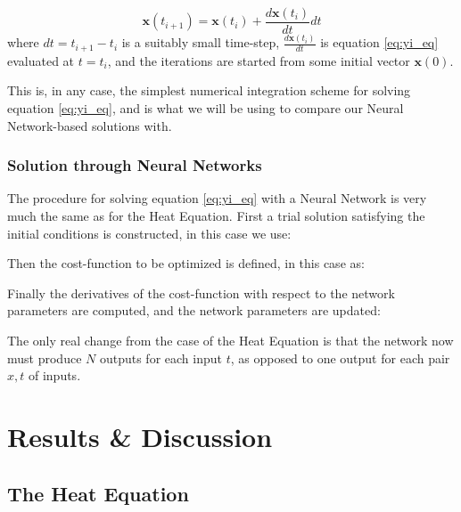 \documentclass[reprint, english, nofootinbib]{revtex4-2}
\begin{document}
\begin{equation}
\label{eq:yi_euler}
\mathbf{x}(t_{i+1}) = \mathbf{x}(t_i) + \frac{d \mathbf{x}(t_i)}{dt}  dt
\end{equation}
where $dt = t_{i+1} -t_{i}$ is a suitably small time-step,  $\frac{d \mathbf{x}(t_i)}{dt}$ is equation \ref{eq:yi_eq} evaluated at $t=t_i$, and the iterations are started from some initial vector $\mathbf{x}(0)$.

This is, in any case, the simplest numerical integration scheme for solving equation \ref{eq:yi_eq}, and is what we will be using to compare our Neural Network-based solutions with.

\subsubsection{Solution through Neural Networks}

The procedure for solving equation \ref{eq:yi_eq} with a Neural Network is very much the same as for the Heat Equation. First a trial solution satisfying the initial conditions is constructed, in this case we use:


Then the cost-function to be optimized is defined, in this case as:


Finally the derivatives of the cost-function with respect to the network parameters are computed, and the network parameters are updated:


The only real change from the case of the Heat Equation is that the network now must produce $N$ outputs for each input $t$, as opposed to one output for each pair $x,t$ of inputs.


\section{Results \& Discussion}

\subsection{The Heat Equation}
\end{document}
